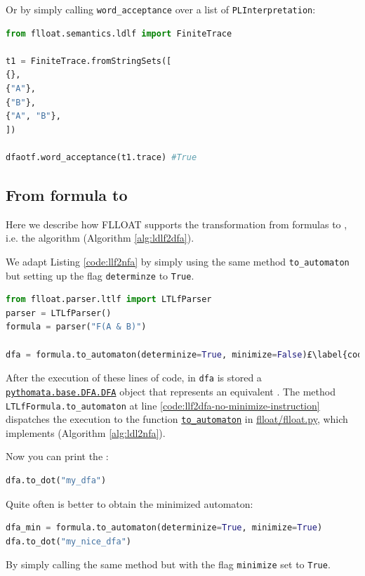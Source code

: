 Or by simply calling \texttt{word\_acceptance} over a list of \texttt{PLInterpretation}:
\begin{lstlisting}[language=Python, style=Python]
from flloat.semantics.ldlf import FiniteTrace

t1 = FiniteTrace.fromStringSets([
{},
{"A"},
{"B"},
{"A", "B"},
])

dfaotf.word_acceptance(t1.trace) #True
\end{lstlisting}

\subsection{From \LLf formula to \DFA}
Here we describe how FLLOAT supports the transformation from \LLf formulas to \DFA, i.e. the \LDLfToDFA algorithm (Algorithm \ref{alg:ldlf2dfa}). 

We adapt Listing \ref{code:llf2nfa} by simply using the same method \texttt{to\_automaton} but setting up the flag \texttt{determinze} to \texttt{True}.
\begin{lstlisting}[language=Python, style=Python, escapechar = £, label={code:llf2dfa-example}, caption={From \LLf to \DFA}]
from flloat.parser.ltlf import LTLfParser
parser = LTLfParser()
formula = parser("F(A & B)")

dfa = formula.to_automaton(determinize=True, minimize=False)£\label{code:llf2dfa-no-minimize-instruction}£

\end{lstlisting}

After the execution of these lines of code, in \texttt{dfa} is stored a \href{https://github.com/MarcoFavorito/pythomata/blob/master/pythomata/base/DFA.py}{\texttt{pythomata.base.DFA.DFA}} object that represents an equivalent \DFA. The method \texttt{LTLfFormula.to\_automaton} at line \ref{code:llf2dfa-no-minimize-instruction} dispatches the execution to the function \href{https://github.com/MarcoFavorito/flloat/blob/0.1.4/flloat/flloat.py#L48-L161}{\texttt{to\_automaton}} in \href{https://github.com/MarcoFavorito/flloat/blob/0.1.4/flloat/flloat.py#L249-L290}{flloat/flloat.py}, which implements \LDLfToDFA (Algorithm \ref{alg:ldl2nfa}). 

Now you can print the \DFA:
\begin{lstlisting}[language=Python, style=Python]
dfa.to_dot("my_dfa")
\end{lstlisting}

Quite often is better to obtain the minimized automaton:
\begin{lstlisting}[language=Python, style=Python]
dfa_min = formula.to_automaton(determinize=True, minimize=True)
dfa.to_dot("my_nice_dfa")
\end{lstlisting}
By simply calling the same method but with the flag \texttt{minimize} set to \texttt{True}.

